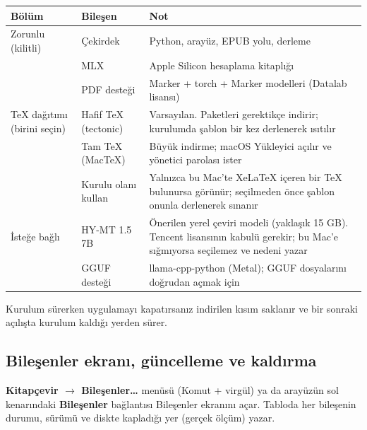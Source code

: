 \documentclass[11pt,a4paper]{article}
\newcommand{\dugme}[1]{\textsf{\bfseries #1}}
\newcommand{\ok}{\(\rightarrow\)}
\begin{document}
\vspace{4pt}
\renewcommand{\arraystretch}{1.3}
\noindent\begin{tabular}{@{}L{3.3cm}L{3.5cm}L{8.2cm}@{}}
\toprule
\textbf{Bölüm} & \textbf{Bileşen} & \textbf{Not} \\
\midrule
Zorunlu (kilitli) & Çekirdek & Python, arayüz, EPUB yolu, derleme \\
 & MLX & Apple Silicon hesaplama kitaplığı \\
 & PDF desteği & Marker + torch + Marker modelleri (Datalab lisansı) \\
\midrule
TeX dağıtımı (birini seçin) & Hafif TeX (tectonic) & Varsayılan. Paketleri gerektikçe indirir; kurulumda şablon bir kez derlenerek ısıtılır \\
 & Tam TeX (MacTeX) & Büyük indirme; macOS Yükleyici açılır ve yönetici parolası ister \\
 & Kurulu olanı kullan & Yalnızca bu Mac'te XeLaTeX içeren bir TeX bulunursa görünür; seçilmeden önce şablon onunla derlenerek sınanır \\
\midrule
İsteğe bağlı & HY-MT 1.5 7B & Önerilen yerel çeviri modeli (yaklaşık 15 GB). Tencent lisansının kabulü gerekir; bu Mac'e sığmıyorsa seçilemez ve nedeni yazar \\
 & GGUF desteği & llama-cpp-python (Metal); GGUF dosyalarını doğrudan açmak için \\
\bottomrule
\end{tabular}
\vspace{6pt}

Kurulum sürerken uygulamayı kapatırsanız indirilen kısım saklanır ve bir
sonraki açılışta kurulum kaldığı yerden sürer.

\subsection{Bileşenler ekranı, güncelleme ve kaldırma}\label{sec:bilesenler}
\textbf{Kitapçevir \ok{} Bileşenler\ldots} menüsü (Komut + virgül) ya da
arayüzün sol kenarındaki \dugme{Bileşenler} bağlantısı Bileşenler ekranını
açar. Tabloda her bileşenin durumu, sürümü ve diskte kapladığı yer
(gerçek ölçüm) yazar.
\end{document}
